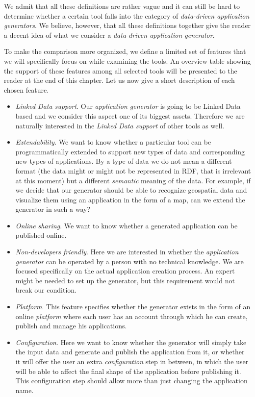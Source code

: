 We admit that all these definitions are rather vague and it can still be hard to determine whether a certain tool falls into the category of \emph{data-driven application generators}. We believe, however, that all these definitions together give the reader a decent idea of what we consider a \emph{data-driven application generator}.

To make the comparison more organized, we define a limited set of features that we will specifically focus on while examining the tools. An overview table showing the support of these features among all selected tools will be presented to the reader at the end of this chapter. Let us now give a short description of each chosen feature.

\begin{itemize}
\item \emph{Linked Data support}. Our \emph{application generator} is going to be Linked Data based and we consider this aspect one of its biggest assets. Therefore we are naturally interested in the \emph{Linked Data support} of other tools as well.
\item \emph{Extendability}. We want to know whether a particular tool can be programmatically extended to support new types of data and corresponding  new types of applications. By a type of data we do not mean a different format (the data might or might not be represented in RDF, that is irrelevant at this moment) but a different \emph{semantic} meaning of the data. For example, if we decide that our generator should be able to recognize geospatial data and visualize them using an application in the form of a map, can we extend the generator in such a way?
\item \emph{Online sharing}. We want to know whether a generated application can be published online.
\item \emph{Non-developers friendly}. Here we are interested in whether the \emph{application generator} can be operated by a person with no technical knowledge. We are focused specifically on the actual application creation process. An expert might be needed to set up the generator, but this requirement would not break our condition.
\item \emph{Platform}. This feature specifies whether the generator exists in the form of an online \emph{platform} where each user has an account through which he can create, publish and manage his applications.
\item \emph{Configuration}. Here we want to know whether the generator will simply take the input data and generate and publish the application from it, or whether it will offer the user an extra \emph{configuration} step in between, in which the user will be able to affect the final shape of the application before publishing it. This configuration step should allow more than just changing the application name.
\end{itemize}

